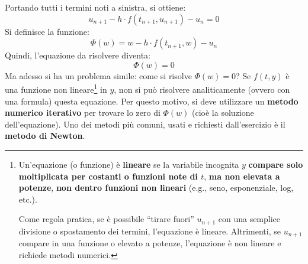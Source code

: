 \begin{itemize}
    Portando tutti i termini noti a sinistra, si ottiene:
    \begin{equation*}
        u_{n+1} - h \cdot f(t_{n+1}, u_{n+1}) - u_n = 0
    \end{equation*}
    Si definisce la funzione:
    \begin{equation*}
        \Phi(w) = w - h \cdot f(t_{n+1}, w) - u_n
    \end{equation*}
    Quindi, l'equazione da risolvere diventa:
    \begin{equation*}
        \Phi(w) = 0 
    \end{equation*}
    Ma adesso si ha un problema simile: come si risolve $\Phi(w) = 0$? Se $f(t, y)$ è una funzione non lineare\footnote{%
        Un'equazione (o funzione) è \textbf{lineare} se la variabile incognita $y$ \textbf{compare solo moltiplicata per costanti o funzioni note di $t$}, \textbf{ma non elevata a potenze}, \textbf{non dentro funzioni non lineari} (e.g., seno, esponenziale, log, etc.).

        Come regola pratica, se è possibile ``tirare fuori'' $u_{n+1}$ con una semplice divisione o spostamento dei termini, l'equazione è lineare. Altrimenti, se $u_{n+1}$ compare in una funzione o elevato a potenze, l'equazione è non lineare e richiede metodi numerici.
    } in $y$, non si può risolvere analiticamente (ovvero con una formula) questa equazione. Per questo motivo, si deve utilizzare un \textbf{metodo numerico iterativo} per trovare lo zero di $\Phi(w)$ (cioè la soluzione dell'equazione). Uno dei metodi più comuni, usati e richiesti dall'esercizio è il \textbf{metodo di Newton}.


\end{itemize}
